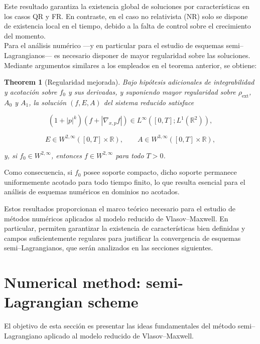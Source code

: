 \documentclass[11pt,a4paper,twoside,pdf]{article}
\numberwithin{equation}{section}
\newtheorem{theorem}{Theorem}[section]
\begin{document}
Este resultado garantiza la existencia global de soluciones por características en los
casos QR y FR. En contraste, en el caso no relativista (NR) solo se dispone de
existencia local en el tiempo, debido a la falta de control sobre el crecimiento del
momento.\\

Para el análisis numérico —y en particular para el estudio de esquemas
semi--Lagrangianos— es necesario disponer de mayor regularidad sobre las soluciones.
Mediante argumentos similares a los empleados en el teorema anterior, se obtiene:

\begin{theorem}[Regularidad mejorada]
Bajo hipótesis adicionales de integrabilidad y acotación sobre $f_0$ y sus derivadas,
y suponiendo mayor regularidad sobre $\rho_{\mathrm{ext}}$, $A_0$ y $A_1$, la solución
$(f,E,A)$ del sistema reducido satisface


\[
(1+|p|^k)(f + |\nabla_{x,p} f|) \in L^\infty([0,T];L^1(\mathbb{R}^2)),
\]




\[
E\in W^{2,\infty}([0,T]\times\mathbb{R}), \qquad
A\in W^{3,\infty}([0,T]\times\mathbb{R}),
\]


y, si $f_0\in W^{2,\infty}$, entonces $f\in W^{2,\infty}$ para todo $T>0$.
\end{theorem}

Como consecuencia, si $f_0$ posee soporte compacto, dicho soporte permanece
uniformemente acotado para todo tiempo finito, lo que resulta esencial para el análisis
de esquemas numéricos en dominios no acotados.

\medskip

Estos resultados proporcionan el marco teórico necesario para el estudio de métodos
numéricos aplicados al modelo reducido de Vlasov--Maxwell. En particular, permiten
garantizar la existencia de características bien definidas y campos suficientemente
regulares para justificar la convergencia de esquemas semi--Lagrangianos, que serán
analizados en las secciones siguientes.





\section{Numerical method: semi-Lagrangian scheme}

El objetivo de esta sección es presentar las ideas fundamentales del método
semi–Lagrangiano aplicado al modelo reducido de Vlasov–Maxwell.
\end{document}
